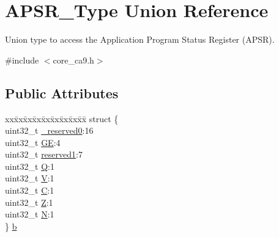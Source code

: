 \hypertarget{union_a_p_s_r___type}{}\section{A\+P\+S\+R\+\_\+\+Type Union Reference}
\label{union_a_p_s_r___type}


Union type to access the Application Program Status Register (A\+P\+SR).  




{\ttfamily \#include $<$core\+\_\+ca9.\+h$>$}

\subsection*{Public Attributes}
\begin{DoxyCompactItemize}
\item 
\begin{tabbing}
xx\=xx\=xx\=xx\=xx\=xx\=xx\=xx\=xx\=\kill
struct \{\\
\>uint32\_t \hyperlink{union_a_p_s_r___type_afbce95646fd514c10aa85ec0a33db728}{\_reserved0}:16\\
\>uint32\_t \hyperlink{union_a_p_s_r___type_adcb98a5b9c93b0cb69cdb7af5638f32e}{GE}:4\\
\>uint32\_t \hyperlink{union_a_p_s_r___type_a268939f602ca41cb4f1f71d7f0eae806}{reserved1}:7\\
\>uint32\_t \hyperlink{union_a_p_s_r___type_a22d10913489d24ab08bd83457daa88de}{Q}:1\\
\>uint32\_t \hyperlink{union_a_p_s_r___type_a8004d224aacb78ca37774c35f9156e7e}{V}:1\\
\>uint32\_t \hyperlink{union_a_p_s_r___type_a86e2c5b891ecef1ab55b1edac0da79a6}{C}:1\\
\>uint32\_t \hyperlink{union_a_p_s_r___type_a3b04d58738b66a28ff13f23d8b0ba7e5}{Z}:1\\
\>uint32\_t \hyperlink{union_a_p_s_r___type_a7e7bbba9b00b0bb3283dc07f1abe37e0}{N}:1\\
\} \hyperlink{union_a_p_s_r___type_a4de9553e1a179b9f95ed77b23e177951}{b}\\


\end{tabbing}
\end{DoxyCompactItemize}
